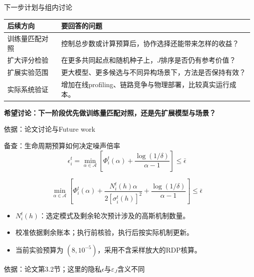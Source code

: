 \documentclass[aspectratio=169,11pt]{beamer}
\newcommand{\key}[1]{{\color{Teal}\bfseries #1}}
\newcommand{\src}[1]{\vfill{\color{Gray}\fontsize{7.5}{9}\selectfont 依据：#1\par}}
\newcommand{\tight}{\setlength{\itemsep}{.18cm}}
\begin{document}
\begin{frame}{下一步计划与组内讨论}
\renewcommand{\arraystretch}{1.55}
\begin{tabular}{@{}p{3.0cm}p{9.3cm}@{}}
\toprule
\textbf{后续方向} & \textbf{要回答的问题}\\
\midrule
训练量匹配对照 & 控制总步数或计算预算后，协作选择还能带来怎样的收益？\\
扩大评分检验 & 在更多共同起点和随机种子上，$J$排序是否仍有参考价值？\\
扩展实验范围 & 更大模型、更多候选与不同异构场景下，方法是否保持有效？\\
实际系统验证 & 增加在线profiling、链路竞争与物理部署，比较真实运行成本。\\
\bottomrule
\end{tabular}\par
\par\vspace{.3cm}
\key{希望讨论：下一阶段优先做训练量匹配对照，还是先扩展模型与场景？}
\src{论文讨论与Future work}
\end{frame}

\appendix
\begin{frame}{备查：生命周期预算如何决定噪声倍率}
\[
\epsilon_i^t
=\min_{\alpha\in\mathcal A}
\left[\Phi_i^t(\alpha)+\frac{\log(1/\delta)}{\alpha-1}\right]
\leq\bar\epsilon
\]
\par\vspace{.1cm}
\[
\min_{\alpha\in\mathcal A}
\left[
\Phi_i^t(\alpha)
+\frac{N_i^t(h)\alpha}{2[\sigma_i^t(h)]^2}
+\frac{\log(1/\delta)}{\alpha-1}
\right]\leq\bar\epsilon
\]
\par\vspace{.2cm}
\begin{itemize}\tight
\item $N_i^t(h)$：选定模式及剩余轮次预计涉及的高斯机制数量。
\item 校准依据剩余账本；执行前核验，执行后按实际机制更新。
\item 当前实验预算为 $(8,10^{-5})$，采用不含采样放大的RDP核算。
\end{itemize}
\src{论文第3.2节；这里的隐私$\epsilon$与$\varepsilon_J$含义不同}
\end{frame}
\end{document}
